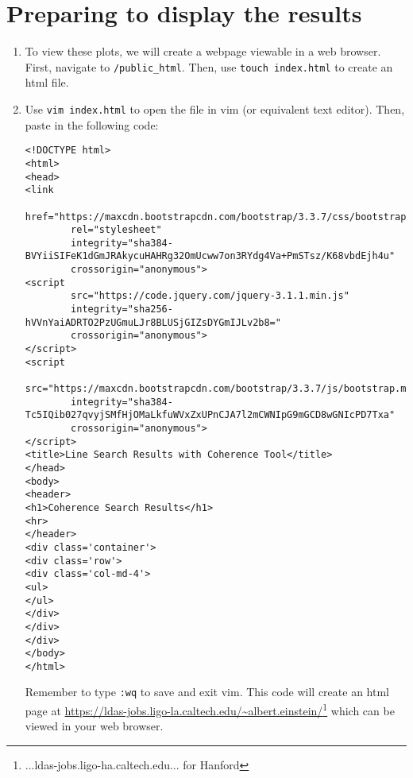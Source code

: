 \documentclass[11pt]{article}
\begin{document}
\section*{Preparing to display the results}
\begin{enumerate}
	\item To view these plots, we will create a webpage viewable in a web browser. First, navigate to {\tt /public\_html}. Then, use {\tt touch index.html} to create an html file.
    \item Use {\tt vim index.html} to open the file in vim (or equivalent text editor). Then, paste in the following code:
	\begin{lstlisting}
<!DOCTYPE html>
<html>
<head>
<link 
        href="https://maxcdn.bootstrapcdn.com/bootstrap/3.3.7/css/bootstrap.min.css" 
        rel="stylesheet" 
        integrity="sha384-BVYiiSIFeK1dGmJRAkycuHAHRg32OmUcww7on3RYdg4Va+PmSTsz/K68vbdEjh4u" 
        crossorigin="anonymous">
<script
        src="https://code.jquery.com/jquery-3.1.1.min.js"
        integrity="sha256-hVVnYaiADRTO2PzUGmuLJr8BLUSjGIZsDYGmIJLv2b8="
        crossorigin="anonymous">
</script>
<script 
        src="https://maxcdn.bootstrapcdn.com/bootstrap/3.3.7/js/bootstrap.min.js" 
        integrity="sha384-Tc5IQib027qvyjSMfHjOMaLkfuWVxZxUPnCJA7l2mCWNIpG9mGCD8wGNIcPD7Txa"
        crossorigin="anonymous">
</script>
<title>Line Search Results with Coherence Tool</title>
</head>
<body>
<header>
<h1>Coherence Search Results</h1>
<hr>
</header>
<div class='container'>
<div class='row'>
<div class='col-md-4'>
<ul>
</ul>
</div>
</div>
</div>
</body>
</html>
	\end{lstlisting}
Remember to type {\tt :wq} to save and exit vim. This code will create an html page at \url{https://ldas-jobs.ligo-la.caltech.edu/~albert.einstein/}\footnote{...ldas-jobs.ligo-ha.caltech.edu... for Hanford} which can be viewed in your web browser.
\end{enumerate}
\end{document}
